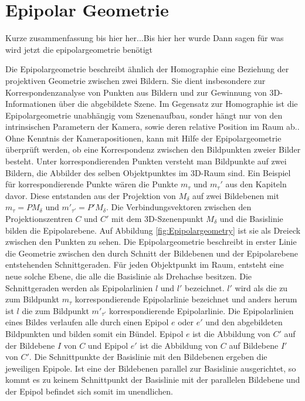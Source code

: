 \chapter{Epipolar Geometrie}
\label{sec:epipolar} 

Kurze zusammenfassung bis hier her...Bis hier her wurde Dann sagen für was wird jetzt die epipolargeometrie benötigt


Die Epipolargeometrie beschreibt ähnlich der Homographie eine Beziehung der projektiven Geometrie zwischen zwei Bildern\cite{HZ}. Sie dient insbesondere zur Korrespondenzanalyse von Punkten aus Bildern und zur Gewinnung von 3D-Informationen über die abgebildete Szene. Im Gegensatz zur Homographie ist die Epipolargeometrie unabhängig vom Szenenaufbau, sonder hängt nur von den intrinsischen Parametern der Kamera, sowie deren relative Position im Raum ab.\cite{HZ}. Ohne Kenntnis der Kamerapositionen, kann mit Hilfe der Epipolargeometrie überprüft werden, ob eine Korrespondenz zwischen den Bildpunkten zweier Bilder besteht. Unter korrespondierenden Punkten versteht man Bildpunkte auf zwei Bildern, die Abbilder des selben Objektpunktes im 3D-Raum sind. Ein Beispiel für korrespondierende Punkte wären die Punkte $m_\tau$ und $m_\tau'$ aus den Kapiteln davor. Diese entstanden aus der Projektion von $M_\delta$ auf zwei Bildebenen mit $m_\tau = PM_\delta$ und $m'_{\tau'} = P'M_\delta$. Die Verbindungsvektoren zwischen den Projektionszentren $C$ und $C'$ mit dem 3D-Szenenpunkt $M_\delta$ und die Basislinie bilden die Epipolarebene. Auf Abbildung \ref{fig:Epipolargeometry} ist sie als Dreieck zwischen den Punkten zu sehen. Die Epipolargeometrie beschreibt in erster Linie die Geometrie zwischen den durch Schnitt der Bildebenen und der Epipolarebene entstehenden Schnittgeraden. Für jeden Objektpunkt im Raum, entsteht eine neue solche Ebene, die alle die Basislinie als Drehachse besitzen\cite{HZ}. Die Schnittgeraden werden als Epipolarlinien $l$ und $l'$ bezeichnet. $l'$ wird als die zu zum Bildpunkt $m_\tau$ korrespondierende Epipolarlinie bezeichnet und anders herum ist $l$ die zum Bildpunkt $m'_{\tau'}$ korrespondierende Epipolarlinie.  Die Epipolarlinien eines Bildes verlaufen alle durch einen Epipol $e$ oder $e'$ und den abgebildeten Bildpunkten und bilden somit ein Bündel. Epipol $e$ ist die Abbildung von $C'$ auf der Bildebene $I$ von $C$ und Epipol $e'$ ist die Abbildung von $C$ auf Bildebene $I'$ von $C'$. Die Schnittpunkte der Basislinie mit den Bildebenen ergeben die jeweiligen Epipole. Ist eine der Bildebenen parallel zur Basislinie ausgerichtet, so kommt es zu keinem Schnittpunkt der Basislinie mit der parallelen Bildebene und der Epipol befindet sich somit im unendlichen\cite{HZ,ZZGXr}.

